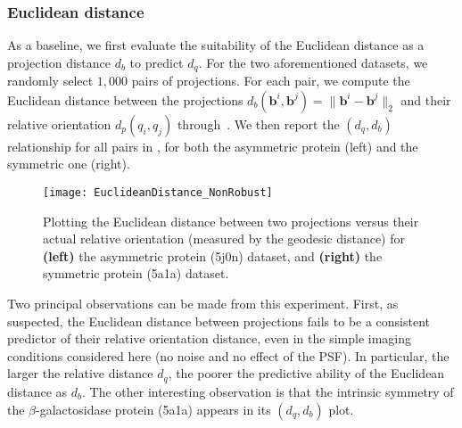 

\subsubsection{Euclidean distance}\label{sec:results:distance-estimation:euclidean}


As a baseline, we first evaluate the suitability of the Euclidean distance as a projection distance $d_b$ to predict $d_q$.
For the two aforementioned datasets, we randomly select $1,000$ pairs of projections.
For each pair, we compute the Euclidean distance between the projections $d_b(\mathbf{b}^i,\mathbf{b}^j)=\lVert\mathbf{b}^i-\mathbf{b}^j\rVert_2$ and their relative orientation $d_p(q_i,q_j)$ through~.
We then report the $(d_q,d_b)$ relationship for all pairs in , for both the asymmetric protein (left) and the symmetric one (right).

\begin{figure}
    \centering
    \texttt{[image: EuclideanDistance\_NonRobust]}
    \caption{
        Plotting the Euclidean distance between two projections versus their actual relative orientation (measured by the geodesic distance) for \textbf{(left)} the asymmetric protein (5j0n) dataset, and \textbf{(right)} the symmetric protein (5a1a) dataset.
    }
    \label{fig:euclidean-not-robust}
\end{figure}

Two principal observations can be made from this experiment.
First, as suspected, the Euclidean distance between projections fails to be a consistent predictor of their relative orientation distance, even in the simple imaging conditions considered here (no noise and no effect of the PSF).
In particular, the larger the relative distance $d_q$, the poorer the predictive ability of the Euclidean distance as $d_b$.
The other interesting observation is that the intrinsic symmetry of the $\beta$-galactosidase protein (5a1a) appears in its $(d_q,d_b)$ plot.

